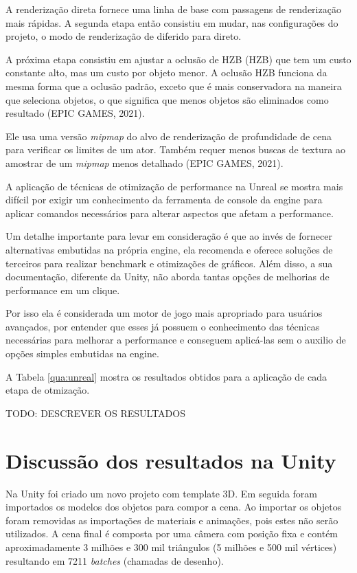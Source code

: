 A renderização direta fornece uma linha de base com passagens de renderização mais rápidas. A segunda etapa então consistiu em mudar, nas configurações do projeto, o modo de renderização de diferido para direto.

A próxima etapa consistiu em ajustar a oclusão de HZB (\acrlong{HZB}) que tem um custo constante alto, mas um custo por objeto menor. A oclusão HZB funciona da mesma forma que a oclusão padrão, exceto que é mais conservadora na maneira que seleciona objetos, o que significa que menos objetos são eliminados como resultado (EPIC GAMES, 2021). 

Ele usa uma versão \textit{mipmap} do alvo de renderização de profundidade de cena para verificar os limites de um ator. Também requer menos buscas de textura ao amostrar de um \textit{mipmap} menos detalhado (EPIC GAMES, 2021)\nocite{unrealdocs}.

A aplicação de técnicas de otimização de performance na Unreal se mostra mais difícil por exigir um conhecimento da ferramenta de console da engine para aplicar comandos necessários para alterar aspectos que afetam a performance.

Um detalhe importante para levar em consideração é que ao invés de fornecer alternativas embutidas na própria engine, ela recomenda e oferece soluções de terceiros para realizar benchmark e otimizações de gráficos. Além disso, a sua documentação, diferente da Unity, não aborda tantas opções de melhorias de performance em um clique. 

Por isso ela é considerada um motor de jogo mais apropriado para usuários avançados, por entender que esses já possuem o conhecimento das técnicas necessárias para melhorar a performance e conseguem aplicá-las sem o auxilio de opções simples embutidas na engine.

A Tabela \ref{qua:unreal} mostra os resultados obtidos para a aplicação de cada etapa de otmização.



TODO: DESCREVER OS RESULTADOS

\section{Discussão dos resultados na Unity}
\label{sec:resultado-unity}

Na Unity foi criado um novo projeto com template 3D. Em seguida foram importados os modelos dos objetos para compor a cena. Ao importar os objetos foram removidas as importações de materiais e animações, pois estes não serão utilizados. A cena final é composta por uma câmera com posição fixa e contém aproximadamente 3 milhões e 300 mil triângulos (5 milhões e 500 mil vértices) resultando em 7211 \textit{batches} (chamadas de desenho).

